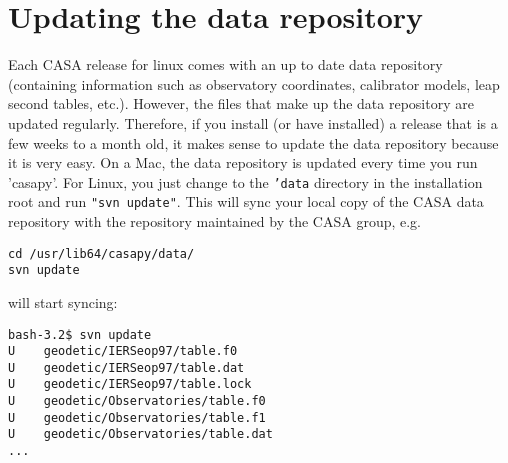 \section{Updating the data repository}
\label{section:install.datarep}


Each CASA release for linux comes with an up to date data repository
(containing information such as observatory coordinates, calibrator
models, leap second tables, etc.). However, the files that make up the
data repository are updated regularly. Therefore, if you install (or
have installed) a release that is a few weeks to a month old, it makes
sense to update the data repository because it is very easy. On a Mac,
the data repository is updated every time you run 'casapy'. For Linux,
you just change to the {\tt 'data} directory in the installation root and
run {\tt "svn update"}. This will sync your local copy of the CASA data
repository with the repository maintained by the CASA group, e.g. 

\small
\begin{verbatim}
cd /usr/lib64/casapy/data/
svn update
\end{verbatim}
\normalsize

will start syncing:

\small
\begin{verbatim}
bash-3.2$ svn update
U    geodetic/IERSeop97/table.f0
U    geodetic/IERSeop97/table.dat
U    geodetic/IERSeop97/table.lock
U    geodetic/Observatories/table.f0
U    geodetic/Observatories/table.f1
U    geodetic/Observatories/table.dat
...
\end{verbatim}
\normalsize



